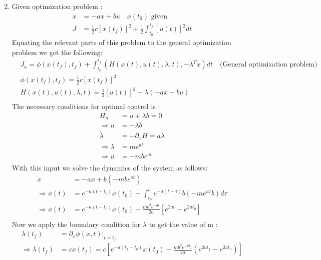 \begin{enumerate}
\begin{equation*}
  \end{equation*}
  \item Given optimization problem :
  \begin{align*}
   \dot x &= -ax + bu \quad x(t_0) \text{ given}\\
   J  &= \frac{1}{2} c \left[ x(t_f) \right]^2 + \frac{1}{2} \int_{t_0}^{t_f} \left[ u(t) \right]^2 dt
  \end{align*}
  Equating the relevant parts of this problem to the general optimization problem we get the following:
  \begin{align*}
   &J_a = \phi(x(t_f),t_f) + \int_{t_0}^{t_f}\left( H(x(t),u(t),\lambda, t), -\lambda^T \dot x\right) dt \quad \text{(General optimization problem)}\\
   &\phi(x(t_f),t_f) =  \frac{1}{2} c \left[ x(t_f) \right]^2 \\
   &H(x(t),u(t),\lambda, t) = \frac{1}{2} \left[ u(t) \right]^2 + \lambda(-ax + bu) \\
  \end{align*}
  The necessary conditions for optimal control is :
  \begin{align*}
   H_u &= u + \lambda b = 0 \\
   \Rightarrow u &= -\lambda b\\
   \dot \lambda &= - \partial_x H = a \lambda \\
   \Rightarrow \lambda &= m e^{at}\\
   \Rightarrow u &= -m b e^{at}\\
  \end{align*}
  With this input we solve the dynamics of the system as follows:
  \begin{align*}
   \dot x &= -ax + b(-m b e^{at}) \\
   \Rightarrow x(t) &= e^{-a(t-t_0)} x(t_0) + \int_{t_0}^{t} e^{-a(t-\tau)} b \left( -m e^{a \tau } b \right) d\tau\\
   \Rightarrow x(t) &= e^{-a(t-t_0)} x(t_0) - \frac{m b^2 e^{-at}}{2a} \left[ e^{2at} - e^{2at_0}\right]\\
  \end{align*}
  Now we apply the boundary condition for $\lambda$ to get the value of m :
  \begin{align*}
   \lambda(t_f) &= \left. \partial_x \phi(x,t) \right|_{t=t_f} \\
   \Rightarrow \lambda(t_f) &= c x(t_f) = c \left[e^{-a(t_f-t_0)} x(t_0) - \frac{m b^2 e^{-at_f}}{2a} \left( e^{2at_f} - e^{2at_0}\right) \right]\\

\end{align*}
\end{enumerate}
